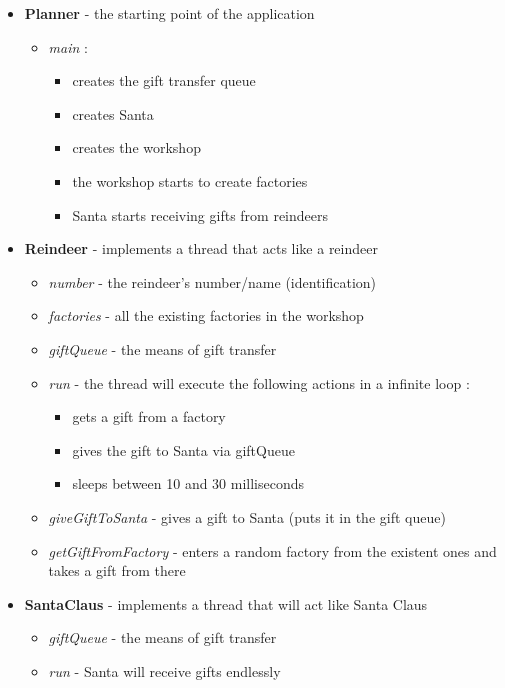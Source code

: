 \documentclass{article}
\begin{document}
\begin{itemize}
\begin{itemize}
            \end{itemize}
        \item \textbf{Planner} - the starting point of the application 
            \begin{itemize}
                \item \textit{main} :
                \begin{itemize}
                    \item creates the gift transfer queue
                    \item creates Santa
                    \item creates the workshop
                    \item the workshop starts to create factories
                    \item Santa starts receiving gifts from reindeers
                \end{itemize}
            \end{itemize}
        \item \textbf{Reindeer} - implements a thread that acts like a reindeer
            \begin{itemize}
                \item \textit{number} - the reindeer's number/name (identification)
                \item \textit{factories} - all the existing factories in the workshop
                \item \textit{giftQueue} - the means of gift transfer
                \item \textit{run} - the thread will execute the following actions in a infinite loop :
                    \begin{itemize}
                        \item gets a gift from a factory
                        \item gives the gift to Santa via giftQueue
                        \item sleeps between 10 and 30 milliseconds
                    \end{itemize}
                \item \textit{giveGiftToSanta} - gives a gift to Santa (puts it in the gift queue)
                \item \textit{getGiftFromFactory} - enters a random factory from the existent ones and takes a gift from there
            \end{itemize}
        \item \textbf{SantaClaus} - implements a thread that will act like Santa Claus
            \begin{itemize}
                \item \textit{giftQueue} - the means of gift transfer
                \item \textit{run} - Santa will receive gifts endlessly 
                    

\end{itemize}
\end{itemize}
\end{document}
